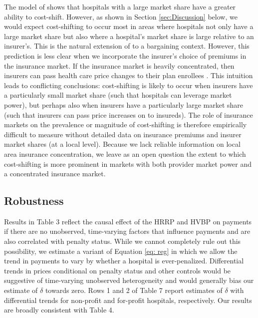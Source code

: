 \documentclass[12pt]{article}
\begin{document}
The model of \cite{dranove1988} shows that hospitals with a large market share have a greater ability to cost-shift.  However, as shown in Section \ref{sec:Discussion} below, we would expect cost-shifting to occur most in areas where hospitals not only have a large market share but also where a hospital's market share is large relative to an insurer's. This is the natural extension of \cite{dranove1988} to a bargaining context.  However, this prediction is less clear when we incorporate the insurer's choice of premiums in the insurance market. If the insurance market is heavily concentrated, then insurers can pass health care price changes to their plan enrollees \citep{ho2016}.  This intuition leads to conflicting conclusions: cost-shifting is likely to occur when insurers have a particularly small market share (such that hospitals can leverage market power), but perhaps also when insurers have a particularly large market share (such that insurers can pass price increases on to insureds). The role of insurance markets on the prevalence or magnitude of cost-shifting is therefore empirically difficult to measure without detailed data on insurance premiums and insurer market shares (at a local level).  Because we lack reliable information on local area insurance concentration, we leave as an open question the extent to which cost-shifting is more prominent in markets with both provider market power and a concentrated insurance market. 


\subsection{Robustness}
Results in Table 3 reflect the causal effect of the HRRP and HVBP on payments if there are no unobserved, time-varying factors that influence payments and are also correlated with penalty status.  While we cannot completely rule out this possibility, we estimate  a variant of Equation \ref{eq: reg} in which we allow the trend in payments to vary by whether a hospital is ever-penalized.  Differential trends in prices conditional on penalty status and other controls would be suggestive of time-varying unobserved heterogeneity and would generally bias our estimate of $\delta$ towards zero.  Rows 1 and 2 of Table 7 report estimates of $\delta$ with differential trends for non-profit and for-profit hospitals, respectively.  Our results are broadly consistent with Table 4.
\end{document}
